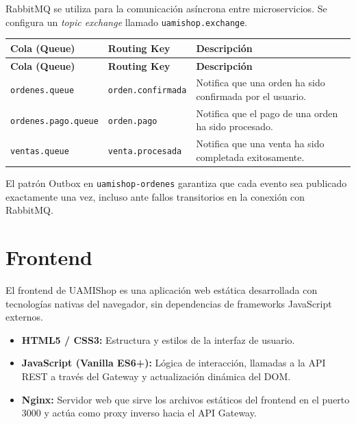 \documentclass[12pt,a4paper]{article}
\begin{document}
RabbitMQ se utiliza para la comunicaci\'on as\'incrona entre microservicios. Se configura
un \textit{topic exchange} llamado \texttt{uamishop.exchange}.

\begin{longtable}{@{}p{4.5cm}p{4.5cm}p{4.5cm}@{}}
  \toprule
  \textbf{Cola (Queue)} & \textbf{Routing Key} & \textbf{Descripci\'on} \\
  \midrule
  \endfirsthead
  \toprule
  \textbf{Cola (Queue)} & \textbf{Routing Key} & \textbf{Descripci\'on} \\
  \midrule
  \endhead
  \bottomrule
  \endfoot
  \texttt{ordenes.queue}         & \texttt{orden.confirmada}   & Notifica que una orden ha sido confirmada por el usuario. \\[4pt]
  \texttt{ordenes.pago.queue}    & \texttt{orden.pago}         & Notifica que el pago de una orden ha sido procesado. \\[4pt]
  \texttt{ventas.queue}          & \texttt{venta.procesada}    & Notifica que una venta ha sido completada exitosamente. \\
\end{longtable}

El patr\'on Outbox en \texttt{uamishop-ordenes} garantiza que cada evento sea publicado
exactamente una vez, incluso ante fallos transitorios en la conexi\'on con RabbitMQ.

\section{Frontend}

El frontend de UAMIShop es una aplicaci\'on web est\'atica desarrollada con tecnolog\'ias
nativas del navegador, sin dependencias de frameworks JavaScript externos.

\begin{itemize}
  \item \textbf{HTML5 / CSS3:} Estructura y estilos de la interfaz de usuario.
  \item \textbf{JavaScript (Vanilla ES6+):} L\'ogica de interacci\'on, llamadas a la API
        REST a trav\'es del Gateway y actualizaci\'on din\'amica del DOM.
  \item \textbf{Nginx:} Servidor web que sirve los archivos est\'aticos del frontend
        en el puerto 3000 y act\'ua como proxy inverso hacia el API Gateway.
\end{itemize}
\end{document}
